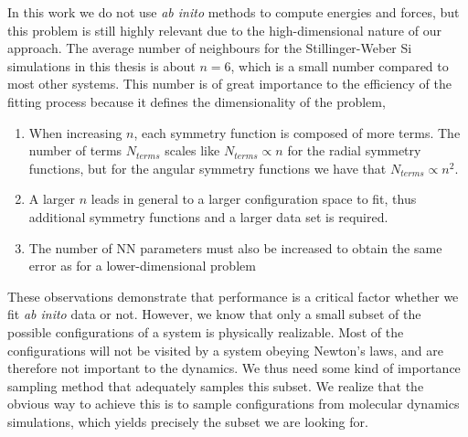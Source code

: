 \documentclass[twoside,english]{uiofysmaster}
\begin{document}
In this work we do not use \textit{ab inito} methods to compute energies and forces, but this problem is still highly relevant
due to the high-dimensional nature of our approach. The average number of neighbours for the Stillinger-Weber Si simulations
in this thesis is about $n=6$, which is a small number compared to most other systems.  
This number is of great importance to the efficiency of the fitting process because it defines the dimensionality 
of the problem,
\begin{enumerate}
 \item When increasing $n$, each symmetry function is composed of 
 more terms. The number of terms $N_{terms}$ scales like $N_{terms} \propto n$ for the radial symmetry functions, 
 but for the angular symmetry functions we have that $N_{terms} \propto n^2$. 
 \item A larger $n$ leads in general to a larger configuration space to fit, thus additional symmetry functions and 
 a larger data set is required. 
 \item The number of NN parameters must also be increased to obtain the same error as for a lower-dimensional problem
\end{enumerate}
These observations demonstrate that performance is a critical factor whether we fit \textit{ab inito} data or 
not. However, we know that only a small subset of the possible configurations of a system is physically realizable. 
Most of the configurations will not be visited by a system obeying Newton's laws, and are therefore not important to
the dynamics. We thus need some kind of importance sampling method that adequately samples this subset. 
We realize that the obvious way to achieve this is to sample configurations from molecular dynamics simulations, which
yields precisely the subset we are looking for. 
\end{document}
